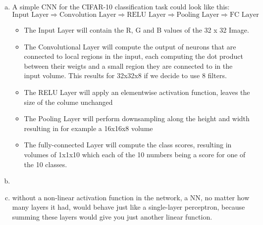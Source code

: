 \documentclass[12pt]{article}
\begin{document}
\subsection{ }
\begin{enumerate}[a)]
    \item 
        A simple CNN for the CIFAR-10 classification task could look like this:
        $$ \text{Input Layer} \Rightarrow \text{Convolution Layer} \Rightarrow \text{RELU Layer} \Rightarrow \text{Pooling Layer} \Rightarrow \text{FC Layer}$$

        \begin{itemize}
            \item 
                The Input Layer will contain the R, G and B values of the 32 x 32 Image. 
            \item
                The Convolutional Layer will compute the output of neurons that are connected to local regions in the input, each computing the dot product between their weigts and a small region they are connected to in the input volume. This results for 32x32x8 if we decide to use 8 filters.
            \item
                The RELU Layer will apply an elementwise activation function, leaves the size of the colume unchanged
            \item
                The Pooling Layer will perform downsampling along the height and width resulting in for example a 16x16x8 volume
            \item
                The fully-connected Layer will compute the class scores, resulting in volumes of 1x1x10 which each of the 10 numbers being a score for one of the 10 classes.
        \end{itemize}

    \item


    \item
        without a non-linear activation function in the network, a NN, no matter how many layers it had, would behave just like a single-layer perceptron, because summing these layers would give you just another linear function.\\


\end{enumerate}
\end{document}
